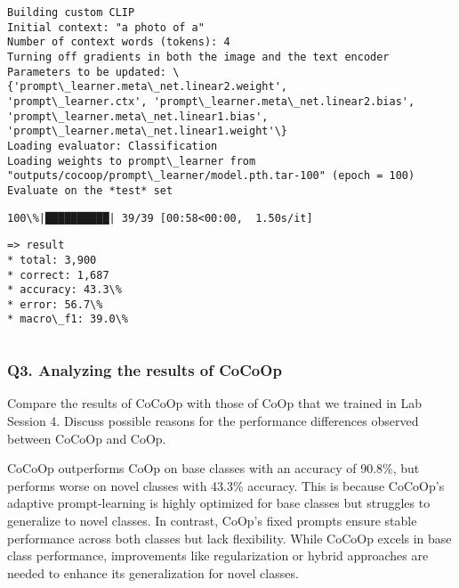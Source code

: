 \documentclass[11pt]{article}
\begin{document}
    \begin{Verbatim}[commandchars=\\\{\}]
Building custom CLIP
Initial context: "a photo of a"
Number of context words (tokens): 4
Turning off gradients in both the image and the text encoder
Parameters to be updated: \{'prompt\_learner.meta\_net.linear2.weight',
'prompt\_learner.ctx', 'prompt\_learner.meta\_net.linear2.bias',
'prompt\_learner.meta\_net.linear1.bias',
'prompt\_learner.meta\_net.linear1.weight'\}
Loading evaluator: Classification
Loading weights to prompt\_learner from
"outputs/cocoop/prompt\_learner/model.pth.tar-100" (epoch = 100)
Evaluate on the *test* set
    \end{Verbatim}

    \begin{Verbatim}[commandchars=\\\{\}]
100\%|██████████| 39/39 [00:58<00:00,  1.50s/it]
    \end{Verbatim}

    \begin{Verbatim}[commandchars=\\\{\}]
=> result
* total: 3,900
* correct: 1,687
* accuracy: 43.3\%
* error: 56.7\%
* macro\_f1: 39.0\%
    \end{Verbatim}

    \begin{Verbatim}[commandchars=\\\{\}]

    \end{Verbatim}

    \subsubsection*{\texorpdfstring{\textbf{Q3. Analyzing the results of
CoCoOp}}{Q3. Analyzing the results of CoCoOp}}\label{q3.-analyzing-the-results-of-cocoop}

Compare the results of CoCoOp with those of CoOp that we trained in Lab
Session 4. Discuss possible reasons for the performance differences
observed between CoCoOp and CoOp.

    CoCoOp outperforms CoOp on base classes with an accuracy of 90.8\%, but
performs worse on novel classes with 43.3\% accuracy. This is because
CoCoOp's adaptive prompt-learning is highly optimized for base classes
but struggles to generalize to novel classes. In contrast, CoOp's fixed
prompts ensure stable performance across both classes but lack
flexibility. While CoCoOp excels in base class performance, improvements
like regularization or hybrid approaches are needed to enhance its
generalization for novel classes.


    
    
    
\end{document}
